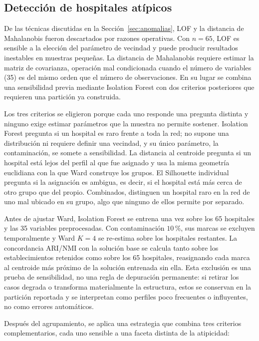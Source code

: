 \subsection{Detección de hospitales atípicos}
\label{sec:outliers-metodo}

De las técnicas discutidas en la Sección~\ref{sec:anomalias}, LOF y la distancia
de Mahalanobis fueron descartados por razones operativas. Con $n = 65$, LOF es
sensible a la elección del parámetro de vecindad y puede producir resultados
inestables en muestras pequeñas. La distancia de Mahalanobis requiere estimar la
matriz de covarianza, operación mal condicionada cuando el número de variables
(35) es del mismo orden que el número de observaciones. En su lugar se combina
una sensibilidad previa mediante Isolation Forest con dos criterios posteriores
que requieren una partición ya construida.

Los tres criterios se eligieron porque cada uno responde una pregunta distinta y
ninguno exige estimar parámetros que la muestra no permite sostener. Isolation
Forest pregunta si un hospital es raro frente a toda la red; no supone una
distribución ni requiere definir una vecindad, y su único parámetro, la
contaminación, se somete a sensibilidad. La distancia al centroide pregunta si
un hospital está lejos del perfil al que fue asignado y usa la misma geometría
euclidiana con la que Ward construye los grupos. El Silhouette individual
pregunta si la asignación es ambigua, es decir, si el hospital está más cerca
de otro grupo que del propio. Combinados, distinguen un hospital raro en la red
de uno mal ubicado en su grupo, algo que ninguno de ellos permite por separado.

Antes de ajustar Ward, Isolation Forest se entrena una vez sobre los 65
hospitales y las 35 variables preprocesadas. Con contaminación $10\,\%$, sus
marcas se excluyen temporalmente y Ward $K=4$ se re-estima sobre los hospitales
restantes. La concordancia ARI/NMI con la solución base se calcula tanto sobre
los establecimientos retenidos como sobre los 65 hospitales, reasignando cada
marca al centroide más próximo de la solución entrenada sin ella. Esta exclusión
es una prueba de sensibilidad, no una regla de depuración permanente: si retirar
los casos degrada o transforma materialmente la estructura, estos se conservan
en la partición reportada y se interpretan como perfiles poco frecuentes o
influyentes, no como errores automáticos.

Después del agrupamiento, se aplica una estrategia que combina tres criterios
complementarios, cada uno sensible a una faceta distinta de la atipicidad:

